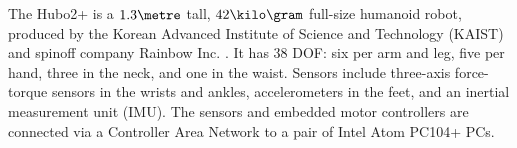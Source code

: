 

The Hubo2+ is a $1.3\meter$ tall, $42 \kilo\gram$ full-size humanoid
robot, produced by the Korean Advanced Institute of Science and
Technology (KAIST) and spinoff company Rainbow Inc. \cite{hubofirst}.
It has 38 DOF: six per arm and leg, five per hand, three in the neck,
and one in the waist.  Sensors include three-axis force-torque sensors
in the wrists and ankles, accelerometers in the feet, and an inertial
measurement unit (IMU).  The sensors and embedded motor controllers
are connected via a Controller Area Network to a pair of Intel Atom
PC104+ PCs.

